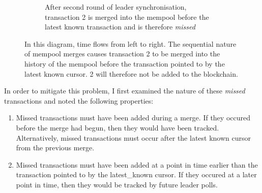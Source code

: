 \documentclass[12pt,a4paper,twoside,openright]{report}
\begin{document}
\begin{figure}
\begin{subfigure}[b]{0.45\textwidth}
					\caption{After second round of leader synchronisation, transaction 2 is merged into the mempool before the latest known transaction and is therefore \textit{missed}}
				\end{subfigure}
				\caption{In this diagram, time flows from left to right. 
				The sequential nature of mempool merges causes transaction 2 to be merged into the history of the mempool before the transaction pointed to by the latest known cursor. 
				2 will therefore not be added to the blockchain.}	
				\label{fig:readremotepartudpatesbroke}
			\end{figure}

			In order to mitigate this problem, I first examined the nature of these \textit{missed} transactions and noted the following properties:
			\begin{enumerate}
				\item Missed transactions must have been added during a merge. If they occured before the merge had begun, then they would have been tracked. 
				Alternatively, missed transactions must occur after the latest known cursor from the previous merge. 
				\item Missed transactions must have been added at a point in time earlier than the transaction pointed to by the latest\_known cursor. 
				If they occured at a later point in time, then they would be tracked by future leader polls.
			\end{enumerate}
\end{document}
